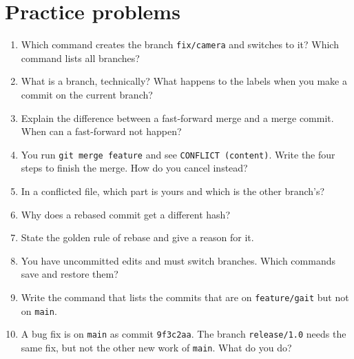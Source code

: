 \section*{Practice problems}
\begin{enumerate}[label=\textbf{\thechapter.\arabic*}]
  \item Which command creates the branch \texttt{fix/camera} and switches to it? Which command lists all branches?
  \item What is a branch, technically? What happens to the labels when you make a commit on the current branch?
  \item Explain the difference between a fast-forward merge and a merge commit. When can a fast-forward not happen?
  \item You run \texttt{git merge feature} and see \texttt{CONFLICT (content)}. Write the four steps to finish the merge. How do you cancel instead?
  \item In a conflicted file, which part is yours and which is the other branch's?
  \item Why does a rebased commit get a different hash?
  \item State the golden rule of rebase and give a reason for it.
  \item You have uncommitted edits and must switch branches. Which commands save and restore them?
  \item Write the command that lists the commits that are on \texttt{feature/gait} but not on \texttt{main}.
  \item[\textbf{\thechapter.10}$\star$] A bug fix is on \texttt{main} as commit \texttt{9f3c2aa}. The branch \texttt{release/1.0} needs the same fix, but not the other new work of \texttt{main}. What do you do?
\end{enumerate}
